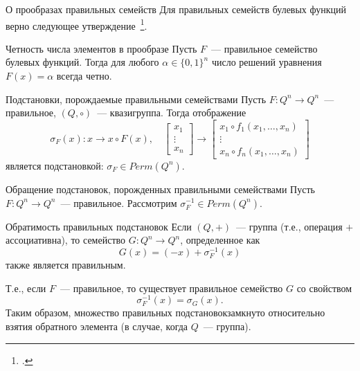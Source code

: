 \begin{frame}{О прообразах правильных семейств}
    Для правильных семейств булевых функций верно следующее утверждение~\footcite{dm21}.
    \begin{alertblock}{Четность числа элементов в прообразе}
    \label{thm:preimage}
        Пусть $F$~--- правильное семейство булевых функций.
        Тогда для любого $\alpha \in \{0, 1\}^n$ число решений уравнения $F(x) = \alpha$ всегда четно.
    \end{alertblock}
\end{frame}


\begin{frame}{Подстановки, порождаемые правильными семействами}
    Пусть $F \colon Q^n \to Q^n$~--- правильное, $(Q, \circ)$~--- квазигруппа.
    Тогда отображение
    \[ 
        \sigma_F(x) \colon x \to x \circ F(x),
        \quad
        \begin{bmatrix}
            x_1 \\
            \vdots \\
            x_n
        \end{bmatrix} 
        \to 
        \begin{bmatrix}
            x_1 \circ f_1(x_1, \ldots, x_n) \\
            \vdots \\
            x_n \circ f_n(x_1, \ldots, x_n)
        \end{bmatrix}
    \]
    является подстановкой: $\sigma_F \in Perm(Q^n)$.
\end{frame}


\begin{frame}{Обращение подстановок, порожденных правильными семействами}
    Пусть $F \colon Q^n \to Q^n$~--- правильное.
    Рассмотрим $\sigma^{-1}_F \in Perm(Q^n)$.
    \begin{alertblock}{Обратимость  \guillemotleft правильных подстановок\guillemotright}
        Если $(Q, +)$~--- группа (т.е., операция $+$ ассоциативна), то семейство $G \colon Q^n \to Q^n$, определенное как
        \[
            G(x) = (-x) + \sigma_F^{-1}(x)
        \]
        также является правильным.
    \end{alertblock}
    Т.е., если $F$~--- правильное, то существует правильное семейство $G$ со свойством
    \[
        \sigma^{-1}_F(x) = \sigma_G(x).
    \]
    \pause 
    Таким образом, множество \guillemotleft правильных подстановок\guillemotright замкнуто относительно взятия обратного элемента (в случае, когда $Q$~--- группа).
\end{frame}


